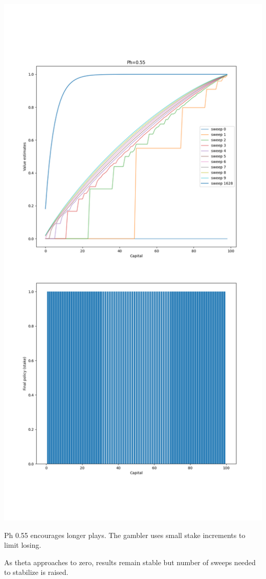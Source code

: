 \documentclass[11pt]{article}
\begin{document}
    \includegraphics[scale=0.4]{figure_4_3_e_4_9_p55}

    Ph 0.55 encourages longer plays.
    The gambler uses small stake increments to limit losing.

    As theta approaches to zero, results remain stable but number of sweeps needed to stabilize is raised.
\end{document}
